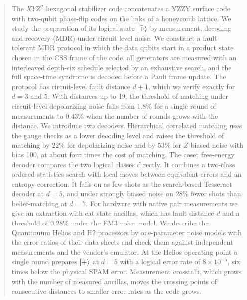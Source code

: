 \begin{abstract}
The $XYZ^2$ hexagonal stabilizer code concatenates a YZZY surface code with two-qubit phase-flip codes on the links of a honeycomb lattice. We study the preparation of its logical state $\ket{\bar{+}}$ by measurement, decoding and recovery (MDR) under circuit-level noise. We construct a fault-tolerant MDR protocol in which the data qubits start in a product state chosen in the CSS frame of the code, all generators are measured with an interleaved depth-six schedule selected by an exhaustive search, and the full space-time syndrome is decoded before a Pauli frame update. The protocol has circuit-level fault distance $d+1$, which we verify exactly for $d=3$ and $5$. With distances up to 19, the threshold of matching under circuit-level depolarizing noise falls from $1.8\%$ for a single round of measurements to $0.43\%$ when the number of rounds grows with the distance. We introduce two decoders. Hierarchical correlated matching uses the gauge checks as a lower decoding level and raises the threshold of matching by $22\%$ for depolarizing noise and by $53\%$ for $Z$-biased noise with bias 100, at about four times the cost of matching. The coset free-energy decoder compares the two logical classes directly. It combines a two-class ordered-statistics search with local moves between equivalent errors and an entropy correction. It fails on as few shots as the search-based Tesseract decoder at $d=5$, and under strongly biased noise on $28\%$ fewer shots than belief-matching at $d=7$. For hardware with native pair measurements we give an extraction with cat-state ancillas, which has fault distance $d$ and a threshold of $0.28\%$ under the EM3 noise model. We describe the Quantinuum Helios and H2 processors by one-parameter noise models with the error ratios of their data sheets and check them against independent measurements and the vendor's emulator. At the Helios operating point a single round prepares $\ket{\bar{+}}$ at $d=5$ with a logical error rate of $8\times10^{-5}$, six times below the physical SPAM error. Measurement crosstalk, which grows with the number of measured ancillas, moves the crossing points of consecutive distances to smaller error rates as the code grows.
\end{abstract}
